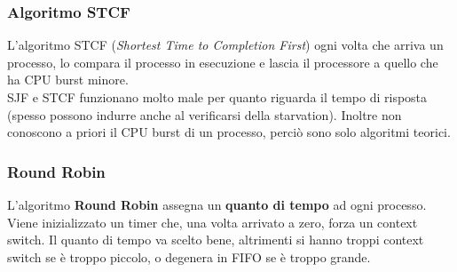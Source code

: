 \documentclass[12pt, letterpaper]{article}
\begin{document}
			\subsubsection{Algoritmo STCF}
				L'algoritmo STCF (\textit{Shortest Time to Completion First}) ogni volta che arriva un processo, lo compara il processo in esecuzione e lascia il processore a quello che ha CPU burst minore.\\
				
			SJF e STCF funzionano molto male per quanto riguarda il tempo di risposta (spesso possono indurre anche al verificarsi della starvation). Inoltre non conoscono a priori il CPU burst di un processo, perciò sono solo algoritmi teorici.
				
			\subsubsection{Round Robin}
				L'algoritmo \textbf{Round Robin} assegna un \textbf{quanto di tempo} ad ogni processo. Viene inizializzato un timer che, una volta arrivato a zero, forza un context switch. Il quanto di tempo va scelto bene, altrimenti si hanno troppi context switch se è troppo piccolo, o degenera in FIFO se è troppo grande.
			
			
\end{document}
